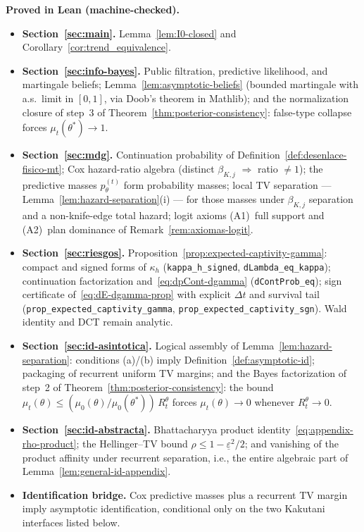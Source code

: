 \documentclass[ecta,nameyear,final,supplement]{econsocart}
\numberwithin{equation}{section}
\numberwithin{table}{section}
\theoremstyle{definition}
\begin{document}
\medskip
\noindent\textbf{Proved in Lean (machine-checked).}
\begin{itemize}
  \item \textbf{Section~\ref{sec:main}.}
  Lemma~\ref{lem:I0-closed} and Corollary~\ref{cor:trend_equivalence}.
  \item \textbf{Section~\ref{sec:info-bayes}.}
  Public filtration, predictive likelihood, and martingale beliefs;
  Lemma~\ref{lem:asymptotic-beliefs} (bounded martingale with a.s.\ limit in
  $[0,1]$, via Doob's theorem in Mathlib); and the normalization closure of
  step~3 of Theorem~\ref{thm:posterior-consistency}: false-type collapse
  forces $\mu_t(\theta^\ast)\to 1$.
  \item \textbf{Section~\ref{sec:mdg}.}
  Continuation probability of Definition~\ref{def:desenlace-fisico-mt}; Cox
  hazard-ratio algebra (distinct $\beta_{K,j}$ $\Rightarrow$ ratio
  $\neq 1$); the predictive masses $p_\theta^{(t)}$ form probability masses;
  local TV separation --- Lemma~\ref{lem:hazard-separation}(i) --- for those
  masses under $\beta_{K,j}$ separation and a non-knife-edge total hazard;
  logit axioms (A1)~full support and (A2)~plan dominance of
  Remark~\ref{rem:axiomas-logit}.
  \item \textbf{Section~\ref{sec:riesgos}.}
  Proposition~\ref{prop:expected-captivity-gamma}: compact and signed forms of
  $\kappa_h$ (\texttt{kappa\_h\_signed}, \texttt{dLambda\_eq\_kappa});
  continuation factorization and~\eqref{eq:dpCont-dgamma}
  (\texttt{dContProb\_eq}); sign certificate
  of~\eqref{eq:dE-dgamma-prop} with explicit $\Delta t$ and survival tail
  (\texttt{prop\_expected\_captivity\_gamma},
  \texttt{prop\_expected\_captivity\_sgn}). Wald identity and DCT remain
  analytic.
  \item \textbf{Section~\ref{sec:id-asintotica}.}
  Logical assembly of Lemma~\ref{lem:hazard-separation}: conditions (a)/(b)
  imply Definition~\ref{def:asymptotic-id}; packaging of recurrent uniform TV
  margins; and the Bayes factorization of step~2 of
  Theorem~\ref{thm:posterior-consistency}: the bound
  $\mu_t(\theta)\le(\mu_0(\theta)/\mu_0(\theta^\ast))\,R_t^\theta$ forces
  $\mu_t(\theta)\to 0$ whenever $R_t^\theta\to 0$.
  \item \textbf{Section~\ref{sec:id-abstracta}.}
  Bhattacharyya product identity~\eqref{eq:appendix-rho-product}; the
  Hellinger--TV bound $\rho\le 1-\underline\varepsilon^2/2$; and vanishing of
  the product affinity under recurrent separation, i.e., the entire algebraic
  part of Lemma~\ref{lem:general-id-appendix}.
  \item \textbf{Identification bridge.}
  Cox predictive masses plus a recurrent TV margin imply asymptotic
  identification, conditional only on the two Kakutani interfaces listed
  below.
\end{itemize}
\end{document}

